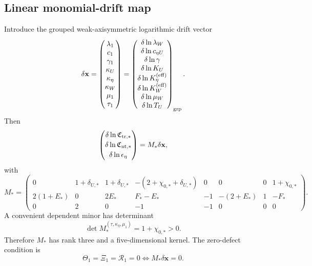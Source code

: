\subsection{Linear monomial-drift map}
Introduce the grouped weak-axisymmetric logarithmic drift vector
\begin{equation}
\label{eq:part05-drift-vector}
\delta\mathbf x
=
\begin{pmatrix}
\lambda_1\\ c_1\\ \gamma_1\\ \kappa_U\\ \kappa_\eta\\ \kappa_W\\ \mu_1\\ \tau_1
\end{pmatrix}
=
\begin{pmatrix}
\delta\ln\lambda_W\\
\delta\ln c_{\eta U}\\
\delta\ln\gamma\\
\delta\ln K_U\\
\delta\ln K_\eta^{({\rm eff})}\\
\delta\ln K_W^{({\rm eff})}\\
\delta\ln\mu_W\\
\delta\ln T_U
\end{pmatrix}_{\rm grp}.
\end{equation}
Then
\begin{equation}
\label{eq:part05-Mstar-drift-map}
\begin{pmatrix}
\delta\ln\mathfrak C_{{\rm tr},*}\\[2pt]
\delta\ln\mathfrak C_{{\rm nt},*}\\[2pt]
\delta\ln\epsilon_\eta
\end{pmatrix}
=
M_*\delta\mathbf x,
\end{equation}
with
\begin{equation}
\label{eq:part05-Mstar-matrix}
M_*=
\begin{pmatrix}
0 & 1+\delta_{U,*} & 1+\delta_{U,*} & -(2+\chi_{0,*}+\delta_{U,*}) & 0 & 0 & 0 & 1+\chi_{0,*}\\[4pt]
2(1+E_*) & 0 & 2E_* & F_*-E_* & -1 & -(2+E_*) & 1 & -F_*\\[4pt]
0 & 2 & 0 & -1 & -1 & 0 & 0 & 0
\end{pmatrix}.
\end{equation}
A convenient dependent minor has determinant
\begin{equation}
\label{eq:part05-Mstar-minor}
\det M_*^{(\tau,\kappa_\eta,\mu_1)}=1+\chi_{0,*}>0.
\end{equation}
Therefore \(M_*\) has rank three and a five-dimensional kernel.  The zero-defect condition is
\begin{equation}
\label{eq:part05-zero-defect-Mstar}
\Theta_1=\Xi_1=\mathcal R_1=0
\iff
M_*\delta\mathbf x=0.
\end{equation}

